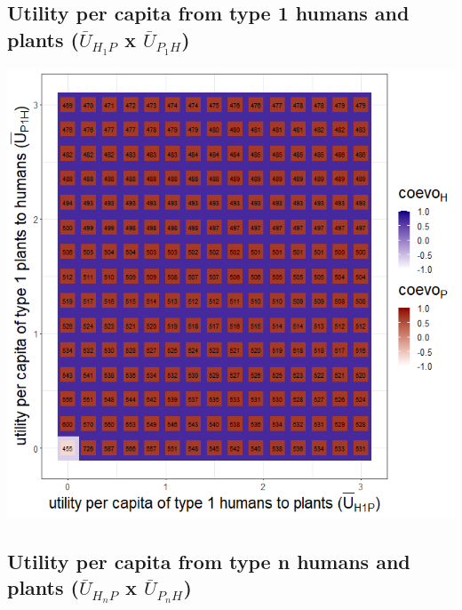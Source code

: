 \documentclass[
]{book}
\begin{document}
\newpage

\hypertarget{utility-per-capita-from-type-1-humans-and-plants-baru_h_1p-x-baru_p_1h}{%
\subsection{\texorpdfstring{Utility per capita from type 1 humans and plants (\(\bar{U}_{H_{1}P}\) x \(\bar{U}_{P_{1}H}\))}{Utility per capita from type 1 humans and plants (\textbackslash bar\{U\}\_\{H\_\{1\}P\} x \textbackslash bar\{U\}\_\{P\_\{1\}H\})}}\label{utility-per-capita-from-type-1-humans-and-plants-baru_h_1p-x-baru_p_1h}}


\includegraphics[width=1\linewidth]{plots/3_exp_utility_per_capita_type_1-tripleRaster_twoParameters}

\newpage

\hypertarget{utility-per-capita-from-type-n-humans-and-plants-baru_h_np-x-baru_p_nh-1}{%
\subsection{\texorpdfstring{Utility per capita from type n humans and plants (\(\bar{U}_{H_{n}P}\) x \(\bar{U}_{P_{n}H}\))}{Utility per capita from type n humans and plants (\textbackslash bar\{U\}\_\{H\_\{n\}P\} x \textbackslash bar\{U\}\_\{P\_\{n\}H\})}}\label{utility-per-capita-from-type-n-humans-and-plants-baru_h_np-x-baru_p_nh-1}}
\end{document}
